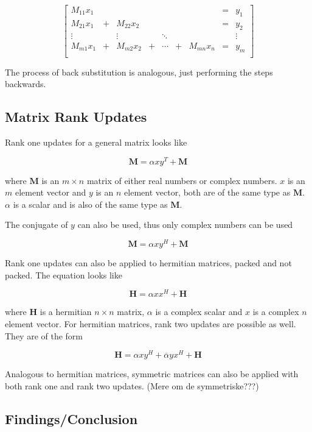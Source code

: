 \[
\left[
\begin{array}{ccccccccc}
M_{11} x_{1} &   &        & &        & & &  = & y_{1}\\
M_{21} x_{1} & + & M_{22} x_{2}  & &        & & &  = & y_{2}\\
\vdots &   & \vdots & & \ddots & & &    & \vdots\\
M_{m1} x_{1} & + & M_{m2} x_{2}  & + & \cdots & + & M_{mn} x_{n} &  = & y_{m}\\
\end{array}
\right]
\]

The process of back substitution is analogous, just performing the
steps backwards.

\subsection{Matrix Rank Updates}

Rank one updates for a general matrix looks like

\[
\mathbf{M} = \alpha x y^T + \mathbf{M}
\]

where $\mathbf{M}$ is an $m \times n$ matrix of either real numbers or
complex numbers. $x$ is an $m$ element vector and $y$ is an $n$
element vector, both are of the same type as $\mathbf{M}$. $\alpha$ is
a scalar and is also of the same type as $\mathbf{M}$.

The conjugate of $y$ can also be used, thus only complex numbers can
be used

\[
\mathbf{M} = \alpha x y^H + \mathbf{M}
\]

Rank one updates can also be applied to hermitian matrices, packed and
not packed. The equation looks like

\[
\mathbf{H} = \alpha x x^H + \mathbf{H}
\]

where $\mathbf{H}$ is a hermitian $n \times n$ matrix, $\alpha$ is a
complex scalar and $x$ is a complex $n$ element vector. For hermitian
matrices, rank two updates are possible as well. They are of the form

\[
\mathbf{H} = \alpha x y^H + \overline{\alpha} y x^H + \mathbf{H}
\]

\noindent 
Analogous to hermitian matrices, symmetric matrices can also be
applied with both rank one and rank two updates. (Mere om de symmetriske???)

\subsection{Findings/Conclusion}

